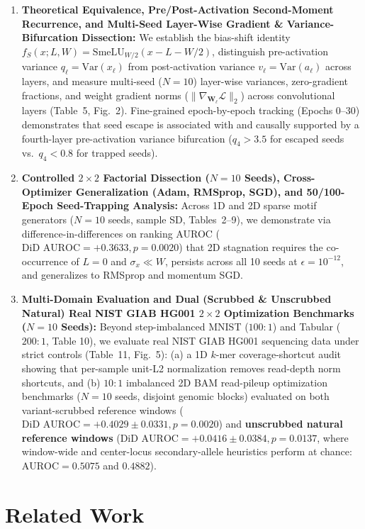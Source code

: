 \documentclass[11pt, a4paper]{article}
\begin{document}
\begin{enumerate}
    \item \textbf{Theoretical Equivalence, Pre/Post-Activation Second-Moment Recurrence, and Multi-Seed Layer-Wise Gradient \& Variance-Bifurcation Dissection:} We establish the bias-shift identity $f_{S}(x; L, W) = \text{SmeLU}_{W/2}(x - L - W/2)$, distinguish pre-activation variance $q_{\ell} = \text{Var}(x_{\ell})$ from post-activation variance $v_{\ell} = \text{Var}(a_{\ell})$ across layers, and measure multi-seed ($N=10$) layer-wise variances, zero-gradient fractions, and weight gradient norms ($\|\nabla_{\mathbf{W}_{\ell}}\mathcal{L}\|_{2}$) across convolutional layers (Table~5, Fig.~2). Fine-grained epoch-by-epoch tracking (Epochs 0--30) demonstrates that seed escape is associated with and causally supported by a fourth-layer pre-activation variance bifurcation ($q_{4} > 3.5$ for escaped seeds vs.\ $q_{4} < 0.8$ for trapped seeds).
    \item \textbf{Controlled $2 \times 2$ Factorial Dissection ($N=10$ Seeds), Cross-Optimizer Generalization (Adam, RMSprop, SGD), and 50/100-Epoch Seed-Trapping Analysis:} Across 1D and 2D sparse motif generators ($N=10$ seeds, sample SD, Tables~2--9), we demonstrate via difference-in-differences on ranking AUROC ($\text{DiD AUROC} = +0.3633, p = 0.0020$) that 2D stagnation requires the co-occurrence of $L = 0$ and $\sigma_{x} \ll W$, persists across all 10 seeds at $\epsilon = 10^{-12}$, and generalizes to RMSprop and momentum SGD.
    \item \textbf{Multi-Domain Evaluation and Dual (Scrubbed \& Unscrubbed Natural) Real NIST GIAB HG001 $2 \times 2$ Optimization Benchmarks ($N=10$ Seeds):} Beyond step-imbalanced MNIST ($100:1$) and Tabular ($200:1$, Table 10), we evaluate real NIST GIAB HG001 sequencing data under strict controls (Table~11, Fig.~5): (a) a 1D $k$-mer coverage-shortcut audit showing that per-sample unit-L2 normalization removes read-depth norm shortcuts, and (b) $10:1$ imbalanced 2D BAM read-pileup optimization benchmarks ($N=10$ seeds, disjoint genomic blocks) evaluated on both variant-scrubbed reference windows ($\text{DiD AUROC} = +0.4029 \pm 0.0331, p = 0.0020$) and \textbf{unscrubbed natural reference windows} ($\text{DiD AUROC} = +0.0416 \pm 0.0384, p = 0.0137$, where window-wide and center-locus secondary-allele heuristics perform at chance: $\text{AUROC} = 0.5075$ and $0.4882$).
\end{enumerate}

\section{Related Work}
\end{document}
